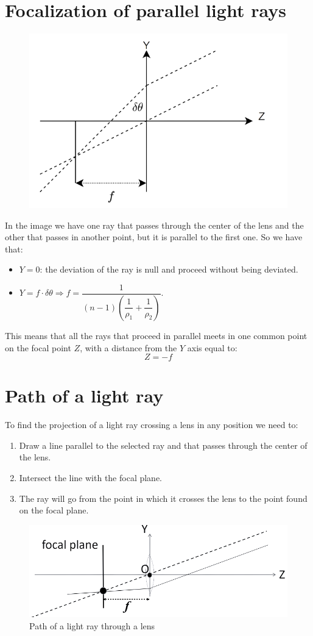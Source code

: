 \documentclass[12pt, a4paper]{report}
\newtheorem[style=M,bodystyle=\normalfont]{theorem}{Theorem}
\newtheorem[style=M,bodystyle=\normalfont]{corollary}{Corollary}
\newtheorem[style=M,bodystyle=\normalfont]{lemma}{Lemma}
\newtheorem[style=M,bodystyle=\normalfont]{definition}{Definition}
\begin{document}
    \section{Focalization of parallel light rays}
    \begin{figure}[H]
        \centering
        \includegraphics[width=0.5\linewidth]{images/focalization.png}
    \end{figure}
    In the image we have one ray that passes through the center of the lens and the other that passes in another point, but it is parallel to the first one. So we have that: 
    \begin{itemize}
        \item $Y=0$: the deviation of the ray is null and proceed without being deviated. 
        \item $Y=f \cdot \delta \theta \Rightarrow f=\dfrac{1}{(n-1)\left( \dfrac{1}{\rho_1} + \dfrac{1}{\rho_2}\right)}$. 
    \end{itemize}
    This means that all the rays that proceed in parallel meets in one common point on the focal point $Z$, with a distance from the $Y$ axis equal to: 
    \[Z=-f\]

    \section{Path of a light ray}
    To find the projection of a light ray crossing a lens in any position we need to:
    \begin{enumerate}
        \item Draw a line parallel to the selected ray and that passes through the center of the lens. 
        \item Intersect the line with the focal plane.
        \item The ray will go from the point in which it crosses the lens to the point found on the focal plane. 
    \end{enumerate}
    \begin{figure}[H]
        \centering
        \includegraphics[width=0.5\linewidth]{images/path.png}
        \caption{Path of a light ray through a lens}
    \end{figure}
\end{document}
